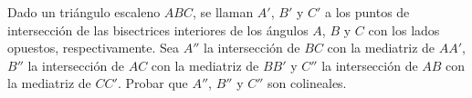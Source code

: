 Dado un triángulo escaleno $ABC$, se llaman $A'$, $B'$ y $C'$ a los puntos de intersección de las bisectrices interiores de los ángulos $A$, $B$ y $C$ con los lados opuestos, respectivamente. \newline 
Sea $A''$ la intersección de $BC$ con la mediatriz de $AA'$, $B''$ la intersección de $AC$ con la mediatriz de $BB'$ y $C''$ la intersección de $AB$ con la mediatriz de $CC'$. \newline 
Probar que $A''$, $B''$ y $C''$ son colineales.

